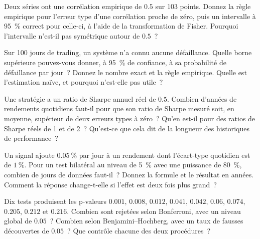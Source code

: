 \begin{question}\label{iq:iv1:statistics:10}
Deux séries ont une corrélation empirique de $0.5$ sur 103 points. Donnez la règle empirique pour l'erreur type d'une corrélation proche de zéro, puis un intervalle à 95~\% correct pour celle-ci, à l'aide de la transformation de Fisher. Pourquoi l'intervalle n'est-il pas symétrique autour de $0.5$~?
\end{question}

\begin{question}\label{iq:iv1:statistics:11}
Sur 100 jours de trading, un système n'a connu aucune défaillance. Quelle borne supérieure pouvez-vous donner, à 95~\% de confiance, à sa probabilité de défaillance par jour~? Donnez le nombre exact et la règle empirique. Quelle est l'estimation naïve, et pourquoi n'est-elle pas utile~?
\end{question}

\begin{question}\label{iq:iv1:statistics:12}
Une stratégie a un ratio de Sharpe annuel réel de $0.5$. Combien d'années de rendements quotidiens faut-il pour que son ratio de Sharpe mesuré soit, en moyenne, supérieur de deux erreurs types à zéro~? Qu'en est-il pour des ratios de Sharpe réels de 1 et de 2~? Qu'est-ce que cela dit de la longueur des historiques de performance~?
\end{question}

\begin{question}\label{iq:iv1:statistics:13}
Un signal ajoute $0.05~\%$ par jour à un rendement dont l'écart-type quotidien est de $1~\%$. Pour un test bilatéral au niveau de 5~\% avec une puissance de 80~\%, combien de jours de données faut-il~? Donnez la formule et le résultat en années. Comment la réponse change-t-elle si l'effet est deux fois plus grand~?
\end{question}

\begin{question}\label{iq:iv1:statistics:14}
Dix tests produisent les p-valeurs $0.001$, $0.008$, $0.012$, $0.041$, $0.042$, $0.06$, $0.074$, $0.205$, $0.212$ et $0.216$. Combien sont rejetées selon Bonferroni, avec un niveau global de $0.05$~? Combien selon Benjamini--Hochberg, avec un taux de fausses découvertes de $0.05$~? Que contrôle chacune des deux procédures~?
\end{question}


